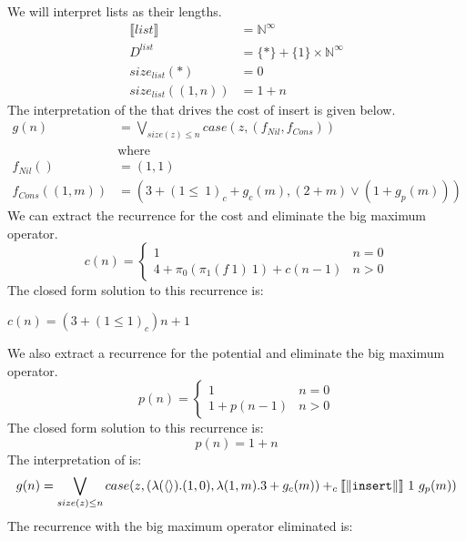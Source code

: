 We will interpret lists as their lengths.
%
\begin{align*}
    \llbracket list \rrbracket &= \mathbb{N}^\infty \\
    D^{list} &= \{\ast\} + \{1\} \times \mathbb{N}^\infty \\
    size_{list} (\ast) &= 0 \\
    size_{list} ((1,n)) &= 1 + n
\end{align*}
%
The interpretation of the  that drives the cost of insert is given below.
%
\begin{align}
  \label{eq:insert_initial_recurrence}
  g(n) &= \bigvee_{size(z) \leq n} case(z, (f_{Nil},f_{Cons})) \\
  &\text{where} \\
  f_{Nil}() &= (1,1) \\
  f_{Cons}((1,m)) &= (3 + (1 \leq\ 1)_c + g_c(m), (2+m) \vee (1+g_p(m)))
\end{align}
%
We can extract the recurrence for the cost and eliminate the big maximum operator.
\begin{equation*}
\label{eq:insert_cost}
c(n) = \begin{cases}
  1 & n = 0 \\
  4 + \pi_0(\pi_1(f\ 1)\ 1) + c(n-1) & n > 0
\end{cases}
\end{equation*}
%
The closed form solution to this recurrence is:
\begin{lemma}
\label{lem:insert_cost}
  $c(n) = (3 + (1 \leq 1)_c)n + 1$
\end{lemma}
%
We also extract a recurrence for the potential and eliminate the big maximum
operator.
%
\begin{equation*}
  \label{eq:insert_potential}
  p(n) = \begin{cases}
    1 & n = 0 \\
    1 + p(n-1) & n > 0
  \end{cases}
\end{equation*}
%
The closed form solution to this recurrence is:
\begin{equation*}
  p(n) = 1 + n
\end{equation*}
%
The interpretation of  is:
%
\begin{equation}
  \label{eq:sort_interp0_init}
  g(n) = \bigvee_{size(z)\leq n} case(z,(\lambda(\langle\rangle).(1,0),\lambda(1,m).3 + g_c(m)) +_c \llbracket\|\texttt{insert}\|\rrbracket\ 1\ g_p(m))
\end{equation}
%
The recurrence with the big maximum operator eliminated is:
